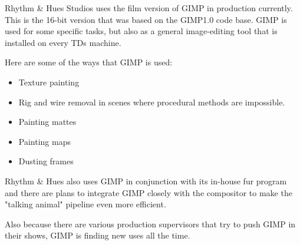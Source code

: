 Rhythm \& Hues Studios uses the film version of GIMP in production currently.
This is the 16-bit version that was based on the GIMP1.0 code base. GIMP is
used for some specific tasks, but also as a general image-editing tool that
is installed on every TDs machine.

Here are some of the ways that GIMP is used:
\begin{itemize}
\item Texture painting 
\item Rig and wire removal in scenes where procedural methods are impossible.
\item Painting mattes
\item Painting maps
\item Dusting frames
\end{itemize}

Rhythm \& Hues also uses GIMP in conjunction with its in-house fur program and
there are plans to integrate GIMP closely with the compositor to make the
"talking animal" pipeline even more efficient.

Also because there are various production supervisors that try to push GIMP in
their shows, GIMP is finding new uses all the time. 
